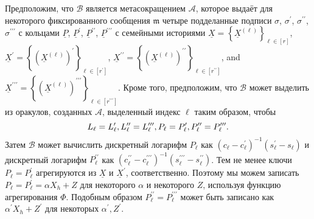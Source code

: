 \documentclass{mrl}
\theoremstyle{definition}
\numberwithin{theorem}{subsection}
\newcommand{\adversary}{\mathcal{A}}
\begin{document}
Предположим, что $\mathcal{B}$ является метасокращением $\adversary$, которое выдаёт для некоторого фиксированного сообщения $\mathfrak{m}$ четыре подделанные подписи $\sigma$, $\sigma^\prime$, $\sigma^{\prime \prime}$, $\sigma^{\prime \prime \prime}$ с кольцами $\underline{P}$, $\underline{P}^\prime$, $\underline{P}^{\prime \prime}$, $\underline{P}^{\prime \prime \prime}$ с семейными историями $\underline{X} = \left\{\underline{X}^{(\ell)}\right\}_{\ell \in [r]}$, $\underline{X}^\prime = \left\{(\underline{X}^{ (\ell)})^\prime\right\}_{\ell \in [r^\prime] }$, $\underline{X}^{\prime \prime} = \left\{(\underline{X}^{(\ell)})^{\prime \prime}\right\}_{\ell \in [r^{\prime \prime}]}$, and $\underline{X}^{\prime \prime \prime} = \left\{(\underline{X}^{ (\ell)})^{\prime \prime \prime}\right\}_{\ell \in [r^{\prime \prime\prime}]}$. Кроме того, предположим, что $\mathcal{B}$ может выделить из оракулов, созданных $\adversary$, выделенный индекс $\ell$ таким образом, чтобы \[L_\ell = L_\ell^\prime, \vspace{0.05in} L_\ell^{\prime \prime} = L_\ell^{\prime \prime \prime}, \vspace{0.05in}
P_\ell = P_\ell^\prime, \vspace{0.05in} P_\ell^{\prime \prime} = P_\ell^{\prime \prime \prime}.\] Затем $\mathcal{B}$ может вычислить дискретный логарифм $P_\ell$ как $(c_\ell - c_\ell^\prime)^{-1}(s_\ell^\prime - s_\ell)$ и дискретный логарифм $P_\ell^{\prime \prime}$ как $(c_\ell^{\prime \prime} - c_\ell^{\prime \prime \prime})^{-1}(s_\ell^{\prime \prime \prime} - s_\ell^{\prime \prime})$. Тем не менее ключи $P_\ell = P_\ell^\prime$ агрегируются из $\underline{X}$ и $\underline{X}^{\prime}$, соответственно. Поэтому мы можем записать $P_\ell = P_\ell^\prime = \alpha X_h + Z$ для некоторого $\alpha$ и некоторого $Z$, используя функцию агрегирования $\Phi$. Подобным образом $P_\ell^{\prime \prime} = P_\ell^{\prime \prime \prime}$ может быть записано как $\alpha^\prime X_h + Z^\prime$ для некоторых $\alpha^\prime, Z^\prime$.
\end{document}
